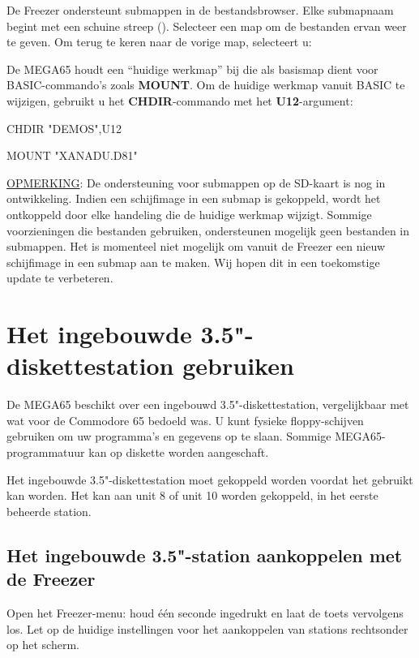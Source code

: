 De Freezer ondersteunt submappen in de bestandsbrowser. Elke submapnaam begint met een schuine streep (\screentext{/}). Selecteer een map om de bestanden ervan weer te geven. Om terug te keren naar de vorige map, selecteert u: 

De MEGA65 houdt een ``huidige werkmap'' bij die als basismap dient voor BASIC-commando's zoals {\bf MOUNT}. Om de huidige werkmap vanuit BASIC te wijzigen, gebruikt u het {\bf CHDIR}-commando met het {\bf U12}-argument:

\begin{screencode}
CHDIR "DEMOS",U12

MOUNT "XANADU.D81"
\end{screencode}

\underline{OPMERKING}: De ondersteuning voor submappen op de SD-kaart is nog in ontwikkeling. Indien een schijfimage in een submap is gekoppeld, wordt het ontkoppeld door elke handeling die de huidige werkmap wijzigt. Sommige voorzieningen die bestanden gebruiken, ondersteunen mogelijk geen bestanden in submappen. Het is momenteel niet mogelijk om vanuit de Freezer een nieuw schijfimage in een submap aan te maken. Wij hopen dit in een toekomstige update te verbeteren.


\section{Het ingebouwde 3.5"-diskette\-station gebruiken}

De MEGA65 beschikt over een ingebouwd 3.5"-diskettestation, vergelijkbaar met wat voor de Commodore 65 bedoeld was. U kunt fysieke floppy-schijven gebruiken om uw programma's en gegevens op te slaan. Sommige MEGA65-programmatuur kan op diskette worden aangeschaft.

Het ingebouwde 3.5"-diskettestation moet gekoppeld worden voordat het gebruikt kan worden. Het kan aan unit 8 of unit 10 worden gekoppeld, in het eerste beheerde station.

\subsection{Het ingebouwde 3.5"-station aankoppelen met de Freezer}

Open het Freezer-menu: houd  één seconde ingedrukt en laat de toets vervolgens los. Let op de huidige instellingen voor het aankoppelen van stations rechtsonder op het scherm.

